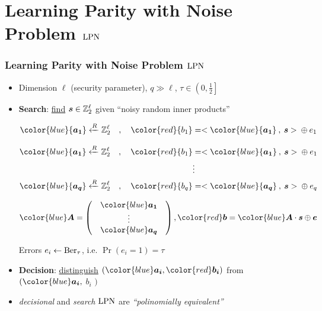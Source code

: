 \section{Learning Parity with Noise Problem $\mathrm{LPN}$}

\begin{frame}
\frametitle{Learning Parity with Noise Problem $\mathrm{LPN}$}
\begin{itemize}
 \item Dimension $\ell$ (security parameter), $q \gg \ell$, $\tau \in \left( 0,\frac{1}{2} \right]$
 \vspace*{5pt}
 \item \textbf{Search}: \underline{find}  $ \boldsymbol{s} \in \mathbb{Z}_2^{\ell}$ given ``noisy random inner products'' \\
 \begin{overprint}
 \begin{align*}
  {\color{blue}{\vect{a_1}}} \R \zol \quad , \quad {\color{red}{b_1}} &= <{\color{blue}{\vect{a_1}}} \: , \: \vect{s}> \: \xor \: e_1 \\  
  \end{align*}

  \begin{align*}
  {\color{blue}{\vect{a_1}}} \R \zol \quad , \quad {\color{red}{b_1}} &= <{\color{blue}{\vect{a_1}}} \: , \: \vect{s}> \: \xor \: e_1 \\
   & \vdots \\
   {\color{blue}{\vect{a_q}}} \R \zol \quad, \quad  {\color{red}{b_q}} &= <{\color{blue}{\vect{a_q}}} \: , \: \vect{s}> \: \xor \: e_q \\
  \end{align*}

  \vspace*{15pt}
\[
{\color{blue} \vect{A}} = \begin{pmatrix}
            & {\color{blue}\vect{a_1}} & \\
            & \vdots  & \\ 
            & {\color{blue}\vect{a_q}} & 
           \end{pmatrix}  , {\color{red} \vect{b}} = {\color{blue} \vect{A}} \cdot \vect{s} \xor \vect{e} 
\]
 \end{overprint}
  Errors $e_i \gets \mathrm{Ber}_{\tau}$, i.e. $\Pr(e_i=1)= \tau$
\end{itemize}
\vspace{5pt}
  \begin{itemize}
    \item \textbf{Decision}: \underline{distinguish} $\left( {\color{blue}\vect{a_i}}, {\color{red}\vect{b_i}} \right)$ from {\color{blue}{uniform}} $( {\color{blue}\vect{a_i}}, $ {\color{blue} $b_i$} $)$ 
\vspace{5pt}
    \item \emph{decisional} and \emph{search} $\mathrm{LPN}$ are \emph{``polinomially equivalent''} \\ 
 \end{itemize}
\end{frame}

